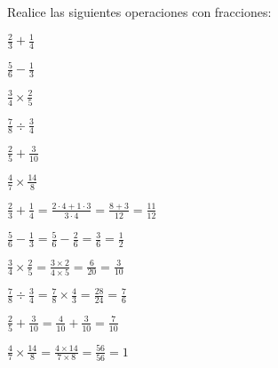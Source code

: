 \begin{exercise}
\problem Realice las siguientes operaciones con fracciones:

\begin{exerciselist}
    \item $\frac{2}{3} + \frac{1}{4}$
    \item $\frac{5}{6} - \frac{1}{3}$
    \item $\frac{3}{4} \times \frac{2}{5}$
    \item $\frac{7}{8} \div \frac{3}{4}$
    \item $\frac{2}{5} + \frac{3}{10}$
    \item $\frac{4}{7} \times \frac{14}{8}$
\end{exerciselist}

\begin{solucion}
\begin{exerciselist}
    \item $\frac{2}{3} + \frac{1}{4} = \frac{2 \cdot 4 + 1 \cdot 3}{3 \cdot 4} = \frac{8 + 3}{12} = \frac{11}{12}$
    \item $\frac{5}{6} - \frac{1}{3} = \frac{5}{6} - \frac{2}{6} = \frac{3}{6} = \frac{1}{2}$
    \item $\frac{3}{4} \times \frac{2}{5} = \frac{3 \times 2}{4 \times 5} = \frac{6}{20} = \frac{3}{10}$
    \item $\frac{7}{8} \div \frac{3}{4} = \frac{7}{8} \times \frac{4}{3} = \frac{28}{24} = \frac{7}{6}$
    \item $\frac{2}{5} + \frac{3}{10} = \frac{4}{10} + \frac{3}{10} = \frac{7}{10}$
    \item $\frac{4}{7} \times \frac{14}{8} = \frac{4 \times 14}{7 \times 8} = \frac{56}{56} = 1$
\end{exerciselist}
\end{solucion}
\end{exercise}

